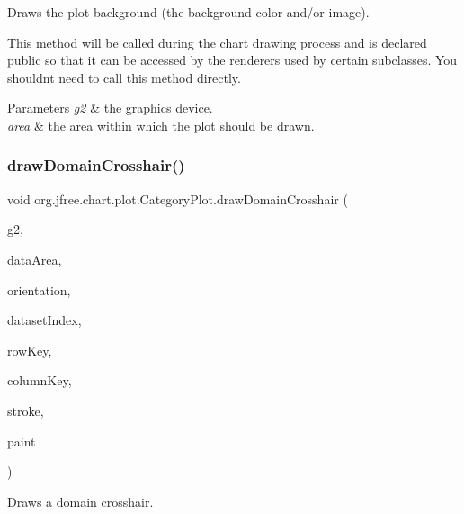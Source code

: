 Draws the plot background (the background color and/or image). 

This method will be called during the chart drawing process and is declared public so that it can be accessed by the renderers used by certain subclasses. You shouldn\textquotesingle{}t need to call this method directly.


\begin{DoxyParams}{Parameters}
{\em g2} & the graphics device. \\
\hline
{\em area} & the area within which the plot should be drawn. \\
\hline
\end{DoxyParams}
\mbox{\label{classorg_1_1jfree_1_1chart_1_1plot_1_1_category_plot_a9e7342df97fda2079c44104e69d6fc6b}} 
\subsubsection{\texorpdfstring{draw\+Domain\+Crosshair()}{drawDomainCrosshair()}}
{\footnotesize\ttfamily void org.\+jfree.\+chart.\+plot.\+Category\+Plot.\+draw\+Domain\+Crosshair (\begin{DoxyParamCaption}\item[{Graphics2D}]{g2,  }\item[{Rectangle2D}]{data\+Area,  }\item[{\mbox{\hyperlink{classorg_1_1jfree_1_1chart_1_1plot_1_1_plot_orientation}{Plot\+Orientation}}}]{orientation,  }\item[{int}]{dataset\+Index,  }\item[{Comparable}]{row\+Key,  }\item[{Comparable}]{column\+Key,  }\item[{Stroke}]{stroke,  }\item[{Paint}]{paint }\end{DoxyParamCaption})\hspace{0.3cm}{\ttfamily [protected]}}

Draws a domain crosshair.


